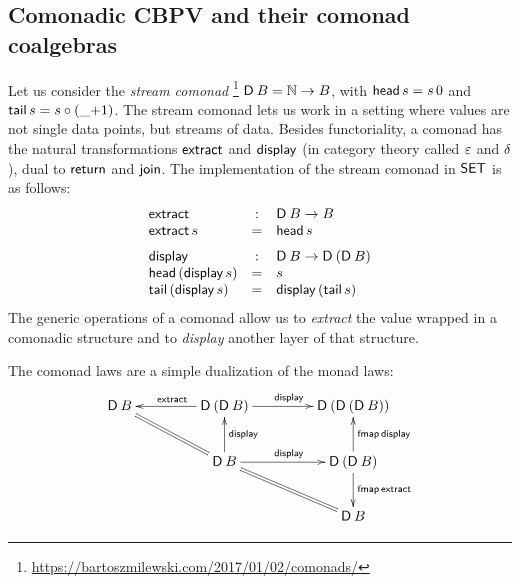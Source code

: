 \documentclass[acmsmall,review,anonymous]{acmart}\settopmatter{printfolios=true,printccs=false,printacmref=false}
\theoremstyle{remark}
\begin{document}
\subsection{Comonadic CBPV and their comonad coalgebras}


Let us consider the \emph{stream comonad}%
\footnote{\url{https://bartoszmilewski.com/2017/01/02/comonads/}}
$\mathsf{D}_{}\,B = \mathbb{N} \to B$,
with $\mathsf{head}\,s = s\,0$ and $\mathsf{tail}\,s = s \circ (\_{+}1)$.
The stream comonad lets us work in a setting where values are not
single data points, but streams of data.
Besides functoriality, a
comonad has the natural transformations $\mathsf{extract}$ and $\mathsf{display}_{}$
(in category theory called $\varepsilon$ and $\delta$),
dual to $\mathsf{return}$ and $\mathsf{join}$.  The implementation of the stream
comonad in $\mathsf{SET}$ is as follows:
\[
\begin{array}{lcl}
  \mathsf{extract} & : & \mathsf{D}_{}\,B \to B \\
  \mathsf{extract}\,s & = & \mathsf{head}\,s
\\[1.5ex]
  \mathsf{display} & : & \mathsf{D}_{}\,B \to \mathsf{D}_{}\,(\mathsf{D}_{}\,B) \\
  \mathsf{head}\,(\mathsf{display}\,s) & = & s \\
  \mathsf{tail}\,(\mathsf{display}\,s) & = & \mathsf{display}\,(\mathsf{tail}\,s) \\
\end{array}
\]
The generic operations of a comonad allow us to \emph{extract} the
value wrapped in a comonadic structure and to \emph{display} another
layer of that structure.

The comonad laws are a simple dualization of the monad laws:
\[
\xymatrix@C=10ex{
\D\,B  \ar@{=}[dr]
  & \D\,(\D\,B) \ar[l]_{\textract} \ar[r]^{\tdisplay}
  & \D\,(\D\,(\D\,B))
\\
  & \D\,B \ar[u]_{\tdisplay} \ar[r]^{\tdisplay} \ar@{=}[dr]
  & \D\,(\D\,B) \ar[u]_{\tfmap\,\tdisplay} \ar[d]^{\tfmap\,\textract}
\\
  &
  & \D\,B
}
\]
\end{document}
